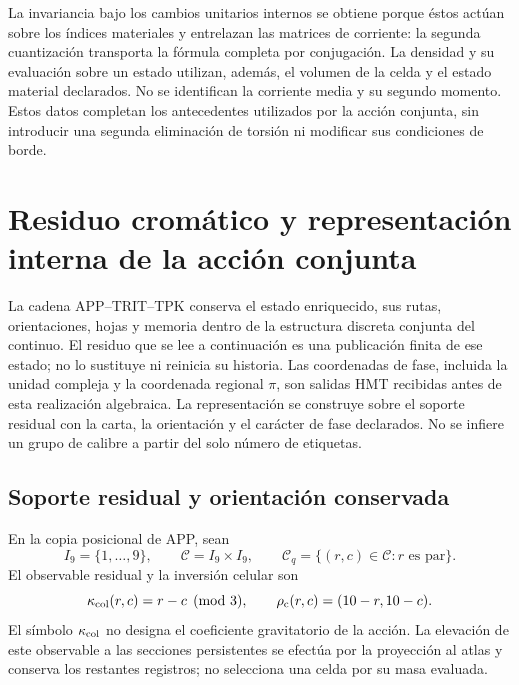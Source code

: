 La invariancia bajo los cambios unitarios internos se obtiene
porque éstos actúan sobre los índices materiales y entrelazan las
matrices de corriente: la segunda cuantización transporta la
fórmula completa por conjugación. La densidad y su evaluación
sobre un estado utilizan, además, el volumen de la celda y el
estado material declarados. No se identifican la corriente media
y su segundo momento. Estos datos completan los antecedentes
utilizados por la acción conjunta, sin introducir una segunda
eliminación de torsión ni modificar sus condiciones de borde.

\section{Residuo cromático y representación interna de la acción conjunta}
\label{hmtcuatro:color:seccion}

La cadena APP--TRIT--TPK conserva el estado enriquecido, sus rutas,
orientaciones, hojas y memoria dentro de la estructura discreta conjunta
del continuo. El residuo que se lee a continuación es una publicación
finita de ese estado; no lo sustituye ni reinicia su historia. Las
coordenadas de fase, incluida la unidad compleja y la coordenada regional
\(\pi\), son salidas HMT recibidas antes de esta realización algebraica.
La representación se construye sobre el soporte residual con la carta,
la orientación y el carácter de fase declarados. No se infiere un grupo
de calibre a partir del solo número de etiquetas.

\subsection{Soporte residual y orientación conservada}
\label{hmtcuatro:color:residuo}

En la copia posicional de APP, sean
\[
 I_9=\{1,\ldots,9\},\qquad
 \mathcal C=I_9\times I_9,\qquad
 \mathcal C_q=\{(r,c)\in\mathcal C:r\text{ es par}\}.
\]
El observable residual y la inversión celular son
\[
 \kappa_{\rm col}(r,c)=r-c\pmod3,\qquad
 \rho_{\rm c}(r,c)=(10-r,10-c).
\]
El símbolo \(\kappa_{\rm col}\) no designa el coeficiente gravitatorio
de la acción. La elevación de este observable a las secciones
persistentes se efectúa por la proyección al atlas y conserva los
restantes registros; no selecciona una celda por su masa evaluada.

